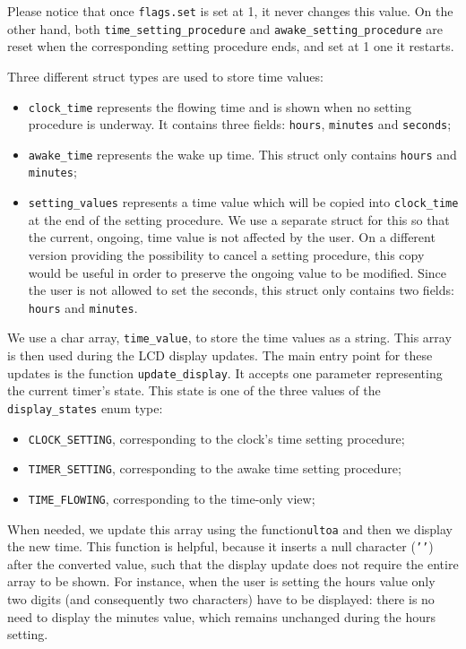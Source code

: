 Please notice that once \texttt{flags.set} is set at 1, it never changes this value. On the other hand, both \texttt{time\_setting\_procedure} and \texttt{awake\_setting\_procedure} are reset when the corresponding setting procedure ends, and set at 1 one it restarts.

Three different struct types are used to store time values:
\begin{itemize}
	\item \texttt{clock\_time} represents the flowing time and is shown when no setting procedure is underway. It contains three fields: \texttt{hours}, \texttt{minutes} and \texttt{seconds};
	\item \texttt{awake\_time} represents the wake up time. This struct only contains \texttt{hours} and \texttt{minutes};
	\item \texttt{setting\_values} represents a time value which will be copied into \texttt{clock\_time} at the end of the setting procedure. We use a separate struct for this so that the current, ongoing, time value is not affected by the user. On a different version providing the possibility to cancel a setting procedure, this copy would be useful in order to preserve the ongoing value to be modified. Since the user is not allowed to set the seconds, this struct only contains two fields: \texttt{hours} and \texttt{minutes}.
\end{itemize}

We use a char array, \texttt{time\_value}, to store the time values as a string. This array is then used during the LCD display updates. The main entry point for these updates is the function \texttt{update\_display}. It accepts one parameter representing the current timer's state. This state is one of the three values of the \texttt{display\_states} enum type:
\begin{itemize}
	\item \texttt{CLOCK\_SETTING}, corresponding to the clock's time setting procedure;
	\item \texttt{TIMER\_SETTING}, corresponding to the awake time setting procedure;
	\item \texttt{TIME\_FLOWING}, corresponding to the time-only view;
\end{itemize}
When needed, we update this array using the function\texttt{ultoa} and then we display the new time. This function is helpful, because it inserts a null character (\texttt{'\0'}) after the converted value, such that the display update does not require the entire array to be shown. For instance, when the user is setting the hours value only two digits (and consequently two characters) have to be displayed: there is no need to display the minutes value, which remains unchanged during the hours setting. 